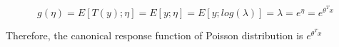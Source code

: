 \begin{answer}
	\begin{equation*}
	    g(\eta) = E[T(y);\eta] = E[y;\eta] = E[y; log(\lambda)]= \lambda = e^{\eta} = e^{\theta^{T}x}
	\end{equation*}
	
	Therefore, the canonical response function of Poisson distribution is $e^{\theta^{T}x}$
\end{answer}
